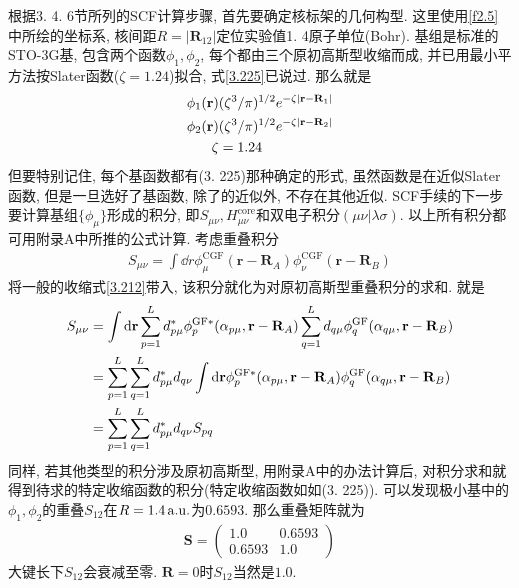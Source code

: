 根据3.
4.
6节所列的SCF计算步骤, 
首先要确定核标架的几何构型. 
这里使用\ref{f2.5}中所绘的坐标系, 
核间距$R=|\mathbf{R}_{12}|$定位实验值1.
4原子单位(Bohr). 
基组是标准的STO-3G基, 
包含两个函数$\phi_1,\phi_2$, 
每个都由三个原初高斯型收缩而成, 
并已用最小平方法按Slater函数($\zeta=1.24$)拟合, 
式\eqref{3.225}已说过. 
那么就是
\begin{equation}
	\begin{split}
		\phi_1(\mathbf{r}) & (\zeta^3/\pi)^{1/2}e^{-\zeta|\mathbf{r-R}_1|}\\
		\phi_2(\mathbf{r}) & (\zeta^3/\pi)^{1/2}e^{-\zeta|\mathbf{r-R}_2|}\\
		\zeta & = 1.24
	\end{split}
\end{equation}
但要特别记住,
每个基函数都有(3.
225)那种确定的形式, 
虽然函数是在近似Slater函数, 
但是一旦选好了基函数, 
除了\hft 的近似外, 
不存在其他近似. 
SCF手续的下一步要计算基组$\{\phi_\mu\}$形成的积分, 
即$S_{\mu\nu}, H_{\mu\nu}^\mathrm{core}$和双电子积分$(\mu\nu|\lambda\sigma)$. 
以上所有积分都可用附录A中所推的公式计算. 
考虑重叠积分
\begin{align}
	S_{\mu\nu} = \int\dd{r}\phi_\mu^\mathrm{CGF}(\mathbf{r-R}_A)\phi_\nu^\mathrm{CGF}(\mathbf{r-R}_B)
\end{align}
将一般的收缩式\eqref{3.212}带入, 
该积分就化为对原初高斯型重叠积分的求和. 
就是
\begin{align}
	S_{\mu\nu} & = \int\dd{r}\sum_{p=1}^{L}d_{p\mu}^*\phi_p^\mathrm{GF*}(\alpha_{p\mu},\mathbf{r-R}_A)\sum_{q=1}^{L}d_{q\mu}\phi_q^\mathrm{GF}(\alpha_{q\mu},\mathbf{r-R}_B)\notag\\
	& = \sum_{p=1}^{L}\sum_{q=1}^{L} d_{p\mu}^*d_{q\nu}\int\dd{r}\phi_p^\mathrm{GF*}(\alpha_{p\mu},\mathbf{r-R}_A)\phi_q^\mathrm{GF}(\alpha_{q\mu},\mathbf{r-R}_B)\notag\\
	& = \sum_{p=1}^{L}\sum_{q=1}^{L}d^*_{p\mu}d_{q\nu}S_{pq}
\end{align}
同样, 
若其他类型的积分涉及原初高斯型, 
用附录A中的办法计算后, 
对积分求和就得到待求的特定收缩函数的积分(特定收缩函数如如(3.
225)). 
可以发现极小基中的$\phi_1,\phi_2$的重叠$S_{12}$在$R=1.4\,\mathrm{a.u.}$为$0.6593$. 
那么重叠矩阵就为
\begin{align}
	\mathbf{S} = 
	\begin{pmatrix}
		1.0 & 0.6593\\0.6593 & 1.0
	\end{pmatrix}
\end{align}
大键长下$S_{12}$会衰减至零. 
$\mathbf{R}=0$时$S_{12}$当然是$1.0$.

